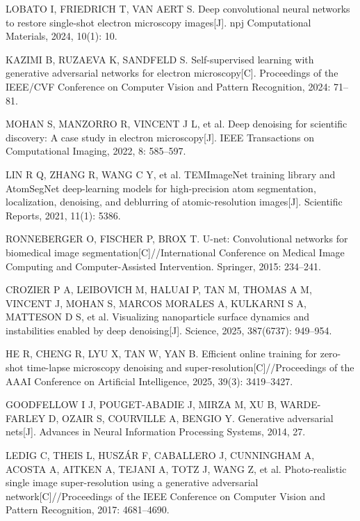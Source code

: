 LOBATO I, FRIEDRICH T, VAN AERT S. Deep convolutional neural networks to restore single-shot electron microscopy images[J]. npj Computational Materials, 2024, 10(1): 10.

KAZIMI B, RUZAEVA K, SANDFELD S. Self-supervised learning with generative adversarial networks for electron microscopy[C]. Proceedings of the IEEE/CVF Conference on Computer Vision and Pattern Recognition, 2024: 71--81.

MOHAN S, MANZORRO R, VINCENT J L, et al. Deep denoising for scientific discovery: A case study in electron microscopy[J]. IEEE Transactions on Computational Imaging, 2022, 8: 585--597.

LIN R Q, ZHANG R, WANG C Y, et al. TEMImageNet training library and AtomSegNet deep-learning models for high-precision atom segmentation, localization, denoising, and deblurring of atomic-resolution images[J]. Scientific Reports, 2021, 11(1): 5386.

RONNEBERGER O, FISCHER P, BROX T. U-net: Convolutional networks for biomedical image segmentation[C]//International Conference on Medical Image Computing and Computer-Assisted Intervention. Springer, 2015: 234--241.

CROZIER P A, LEIBOVICH M, HALUAI P, TAN M, THOMAS A M, VINCENT J, MOHAN S, MARCOS MORALES A, KULKARNI S A, MATTESON D S, et al. Visualizing nanoparticle surface dynamics and instabilities enabled by deep denoising[J]. Science, 2025, 387(6737): 949--954.

HE R, CHENG R, LYU X, TAN W, YAN B. Efficient online training for zero-shot time-lapse microscopy denoising and super-resolution[C]//Proceedings of the AAAI Conference on Artificial Intelligence, 2025, 39(3): 3419--3427.

GOODFELLOW I J, POUGET-ABADIE J, MIRZA M, XU B, WARDE-FARLEY D, OZAIR S, COURVILLE A, BENGIO Y. Generative adversarial nets[J]. Advances in Neural Information Processing Systems, 2014, 27.

LEDIG C, THEIS L, HUSZÁR F, CABALLERO J, CUNNINGHAM A, ACOSTA A, AITKEN A, TEJANI A, TOTZ J, WANG Z, et al. Photo-realistic single image super-resolution using a generative adversarial network[C]//Proceedings of the IEEE Conference on Computer Vision and Pattern Recognition, 2017: 4681--4690.

